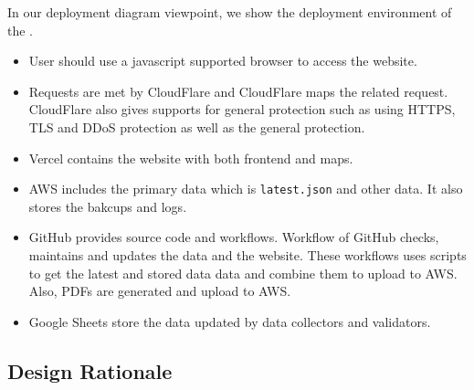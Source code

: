 In our deployment diagram viewpoint, we show the deployment environment of the \afetbilgi.
\begin{itemize}
  \item User should use a javascript supported browser to access the website.
  \item Requests are met by CloudFlare and CloudFlare maps the related request. CloudFlare also gives supports for general protection such as using HTTPS, TLS and DDoS protection as well as the general protection.
  \item Vercel contains the website with both frontend and maps.
  \item AWS includes the primary data which is \texttt{latest.json} and other data. It also stores the bakcups and logs.
  \item GitHub provides source code and workflows. Workflow of GitHub checks, maintains and updates the data and the website. These workflows uses scripts to get the latest and stored data data and combine them to upload to AWS. Also, PDFs are generated and upload to AWS.
  \item Google Sheets store the data updated by data collectors and validators.
\end{itemize}

\subsection{Design Rationale}
